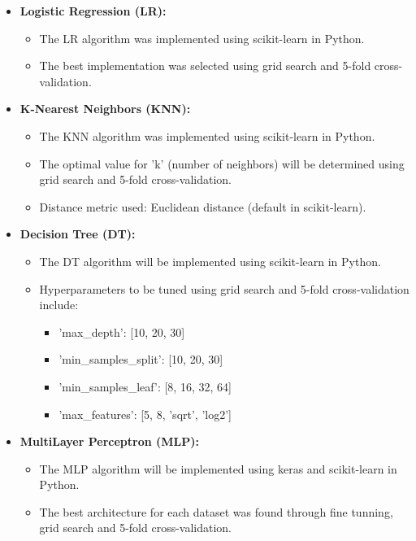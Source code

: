 \documentclass[conference]{IEEEtran}
\begin{document}
\begin{itemize}
\item \textbf{Logistic Regression (LR):} 
    \begin{itemize}
    \item The LR algorithm was implemented using scikit-learn in Python.
    \item The best implementation was selected using grid search and 5-fold cross-validation.
    \end{itemize}
    
\item \textbf{K-Nearest Neighbors (KNN):} 
    \begin{itemize}
    \item The KNN algorithm was implemented using scikit-learn in Python.
    \item The optimal value for 'k' (number of neighbors) will be determined using grid search and 5-fold cross-validation.
    \item Distance metric used: Euclidean distance (default in scikit-learn).
    \end{itemize}

\item \textbf{Decision Tree (DT):}
    \begin{itemize}
    \item The DT algorithm will be implemented using scikit-learn in Python.
    \item Hyperparameters to be tuned using grid search and 5-fold cross-validation include:
        \begin{itemize}
        \item 'max\_depth': [10, 20, 30] 
        \item 'min\_samples\_split': [10, 20, 30] 
        \item 'min\_samples\_leaf': [8, 16, 32, 64] 
        \item 'max\_features': [5, 8, 'sqrt', 'log2']
        \end{itemize}
    \end{itemize}

\item \textbf{MultiLayer Perceptron (MLP):}
    \begin{itemize}
    \item The MLP algorithm will be implemented using keras and scikit-learn in Python. 
    \item The best architecture for each dataset was found through fine tunning, grid search and 5-fold cross-validation. 
    \end{itemize}
\end{itemize}
\end{document}

